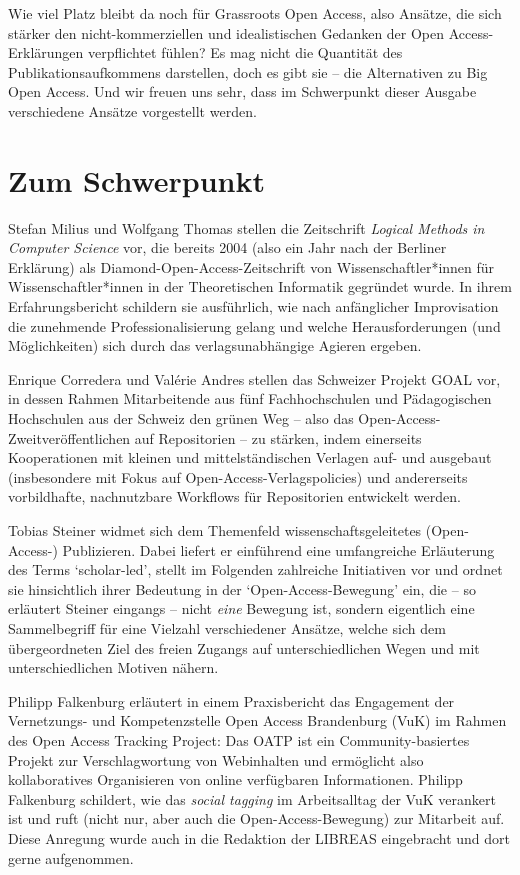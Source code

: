 \documentclass[a4paper,
fontsize=11pt,
oneside,
numbers=noperiodatend,
parskip=half-,
bibliography=totoc,
final
]{scrartcl}
\begin{document}
Wie viel Platz bleibt da noch für Grassroots Open Access, also Ansätze,
die sich stärker den nicht-kommerziellen und idealistischen Gedanken der
Open Access-Erklärungen verpflichtet fühlen? Es mag nicht die Quantität
des Publikationsaufkommens darstellen, doch es gibt sie -- die
Alternativen zu Big Open Access. Und wir freuen uns sehr, dass im
Schwerpunkt dieser Ausgabe verschiedene Ansätze vorgestellt werden.

\hypertarget{zum-schwerpunkt}{%
\section{Zum Schwerpunkt}\label{zum-schwerpunkt}}

Stefan Milius und Wolfgang Thomas stellen die Zeitschrift \emph{Logical
Methods in Computer Science} vor, die bereits 2004 (also ein Jahr nach
der Berliner Erklärung) als Diamond-Open-Access-Zeitschrift von
Wissenschaftler*innen für Wissenschaftler*innen in der Theoretischen
Informatik gegründet wurde. In ihrem Erfahrungsbericht schildern sie
ausführlich, wie nach anfänglicher Improvisation die zunehmende
Professionalisierung gelang und welche Herausforderungen (und
Möglichkeiten) sich durch das verlagsunabhängige Agieren ergeben.

Enrique Corredera und Valérie Andres stellen das Schweizer Projekt GOAL
vor, in dessen Rahmen Mitarbeitende aus fünf Fachhochschulen und
Pädagogischen Hochschulen aus der Schweiz den grünen Weg -- also das
Open-Access-Zweitveröffentlichen auf Repositorien -- zu stärken, indem
einerseits Kooperationen mit kleinen und mittelständischen Verlagen auf-
und ausgebaut (insbesondere mit Fokus auf Open-Access-Verlagspolicies)
und andererseits vorbildhafte, nachnutzbare Workflows für Repositorien
entwickelt werden.

Tobias Steiner widmet sich dem Themenfeld wissenschaftsgeleitetes
(Open-Access-) Publizieren. Dabei liefert er einführend eine
umfangreiche Erläuterung des Terms \enquote*{scholar-led}, stellt im
Folgenden zahlreiche Initiativen vor und ordnet sie hinsichtlich ihrer
Bedeutung in der \enquote*{Open-Access-Bewegung} ein, die -- so
erläutert Steiner eingangs -- nicht \emph{eine} Bewegung ist, sondern
eigentlich eine Sammelbegriff für eine Vielzahl verschiedener Ansätze,
welche sich dem übergeordneten Ziel des freien Zugangs auf
unterschiedlichen Wegen und mit unterschiedlichen Motiven nähern.

Philipp Falkenburg erläutert in einem Praxisbericht das Engagement der
Vernetzungs- und Kompetenzstelle Open Access Brandenburg (VuK) im Rahmen
des Open Access Tracking Project: Das OATP ist ein Community-basiertes
Projekt zur Verschlagwortung von Webinhalten und ermöglicht also
kollaboratives Organisieren von online verfügbaren Informationen.
Philipp Falkenburg schildert, wie das \emph{social tagging} im
Arbeitsalltag der VuK verankert ist und ruft (nicht nur, aber auch die
Open-Access-Bewegung) zur Mitarbeit auf. Diese Anregung wurde auch in
die Redaktion der LIBREAS eingebracht und dort gerne aufgenommen.
\end{document}
